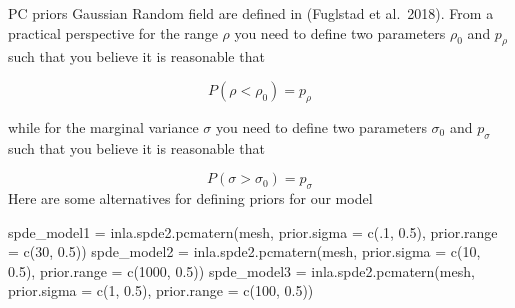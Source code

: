 \documentclass[
  letterpaper,
  DIV=11,
  numbers=noendperiod]{scrartcl}
\newenvironment{Shaded}{\begin{snugshade}}{\end{snugshade}}
\newcommand{\AttributeTok}[1]{\textcolor[rgb]{0.40,0.45,0.13}{#1}}
\newcommand{\DecValTok}[1]{\textcolor[rgb]{0.68,0.00,0.00}{#1}}
\newcommand{\FloatTok}[1]{\textcolor[rgb]{0.68,0.00,0.00}{#1}}
\newcommand{\FunctionTok}[1]{\textcolor[rgb]{0.28,0.35,0.67}{#1}}
\newcommand{\NormalTok}[1]{\textcolor[rgb]{0.00,0.23,0.31}{#1}}
\newcommand{\OtherTok}[1]{\textcolor[rgb]{0.00,0.23,0.31}{#1}}
\begin{document}
PC priors Gaussian Random field are defined in (Fuglstad et al.~2018).
From a practical perspective for the range \(\rho\) you need to define
two parameters \(\rho_0\) and \(p_{\rho}\) such that you believe it is
reasonable that

\[
P(\rho<\rho_0)=p_{\rho}
\]

while for the marginal variance \(\sigma\) you need to define two
parameters \(\sigma_0\) and \(p_{\sigma}\) such that you believe it is
reasonable that

\[
P(\sigma>\sigma_0)=p_{\sigma}
\] Here are some alternatives for defining priors for our model

\begin{Shaded}
\begin{Highlighting}[]
\NormalTok{spde\_model1 }\OtherTok{=}  \FunctionTok{inla.spde2.pcmatern}\NormalTok{(mesh,}
                                  \AttributeTok{prior.sigma =} \FunctionTok{c}\NormalTok{(.}\DecValTok{1}\NormalTok{, }\FloatTok{0.5}\NormalTok{),}
                                  \AttributeTok{prior.range =} \FunctionTok{c}\NormalTok{(}\DecValTok{30}\NormalTok{, }\FloatTok{0.5}\NormalTok{))}
\NormalTok{spde\_model2 }\OtherTok{=}  \FunctionTok{inla.spde2.pcmatern}\NormalTok{(mesh,}
                                  \AttributeTok{prior.sigma =} \FunctionTok{c}\NormalTok{(}\DecValTok{10}\NormalTok{, }\FloatTok{0.5}\NormalTok{),}
                                  \AttributeTok{prior.range =} \FunctionTok{c}\NormalTok{(}\DecValTok{1000}\NormalTok{, }\FloatTok{0.5}\NormalTok{))}
\NormalTok{spde\_model3 }\OtherTok{=}  \FunctionTok{inla.spde2.pcmatern}\NormalTok{(mesh,}
                                  \AttributeTok{prior.sigma =} \FunctionTok{c}\NormalTok{(}\DecValTok{1}\NormalTok{, }\FloatTok{0.5}\NormalTok{),}
                                  \AttributeTok{prior.range =} \FunctionTok{c}\NormalTok{(}\DecValTok{100}\NormalTok{, }\FloatTok{0.5}\NormalTok{))}
\end{Highlighting}
\end{Shaded}
\end{document}
